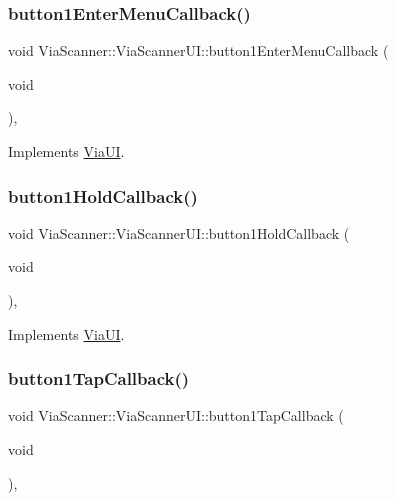 \subsubsection{\texorpdfstring{button1\+Enter\+Menu\+Callback()}{button1EnterMenuCallback()}}
{\footnotesize\ttfamily void Via\+Scanner\+::\+Via\+Scanner\+U\+I\+::button1\+Enter\+Menu\+Callback (\begin{DoxyParamCaption}\item[{void}]{ }\end{DoxyParamCaption})\hspace{0.3cm}{\ttfamily [override]}, {\ttfamily [virtual]}}



Implements \mbox{\hyperlink{class_via_u_i_ae00249c10af94437c357222328a56f82}{Via\+UI}}.

\mbox{\label{class_via_scanner_1_1_via_scanner_u_i_a8d7608e430d6be2777f4fb76b4ea9f2b}} 
\subsubsection{\texorpdfstring{button1\+Hold\+Callback()}{button1HoldCallback()}}
{\footnotesize\ttfamily void Via\+Scanner\+::\+Via\+Scanner\+U\+I\+::button1\+Hold\+Callback (\begin{DoxyParamCaption}\item[{void}]{ }\end{DoxyParamCaption})\hspace{0.3cm}{\ttfamily [override]}, {\ttfamily [virtual]}}



Implements \mbox{\hyperlink{class_via_u_i_a62145ce1c1b664ff0a1aadaac9386162}{Via\+UI}}.

\mbox{\label{class_via_scanner_1_1_via_scanner_u_i_a0347e038aa4ac6c8e7e9f50272cc19d8}} 
\subsubsection{\texorpdfstring{button1\+Tap\+Callback()}{button1TapCallback()}}
{\footnotesize\ttfamily void Via\+Scanner\+::\+Via\+Scanner\+U\+I\+::button1\+Tap\+Callback (\begin{DoxyParamCaption}\item[{void}]{ }\end{DoxyParamCaption})\hspace{0.3cm}{\ttfamily [override]}, {\ttfamily [virtual]}}



